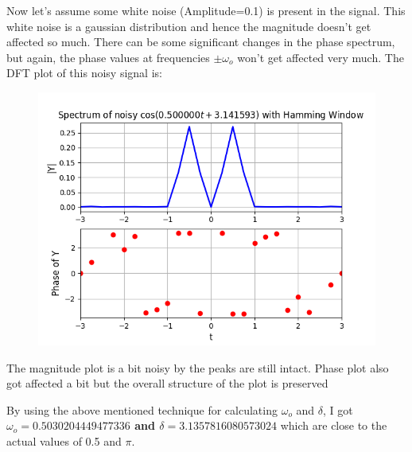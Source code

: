 \documentclass[12pt, a4paper]{article}
\begin{document}
Now let's assume some white noise (Amplitude=0.1) is present in the signal. This white noise is a gaussian distribution and hence the magnitude doesn't get affected so much. There can be some significant changes in the phase spectrum, but again, the phase values at frequencies $\pm \omega_{o}$ won't get affected very much.
The DFT plot of this noisy signal is:
\begin{figure}[H]
    \centering
    \includegraphics[scale = 0.8]{Figure_12.png}
    \label{fig:sample}
\end{figure}
\begin{center}
    The magnitude plot is a bit noisy by the peaks are still intact. Phase plot also got affected a bit but the overall structure of the plot is preserved
\end{center}
By using the above mentioned technique for calculating $\omega_{o}$ and $\delta$, I got \textbf{$\omega_{o} = 0.5030204449477336$ and $\delta = 3.1357816080573024$} which are close to the actual values of 0.5 and $\pi$.
\end{document}
